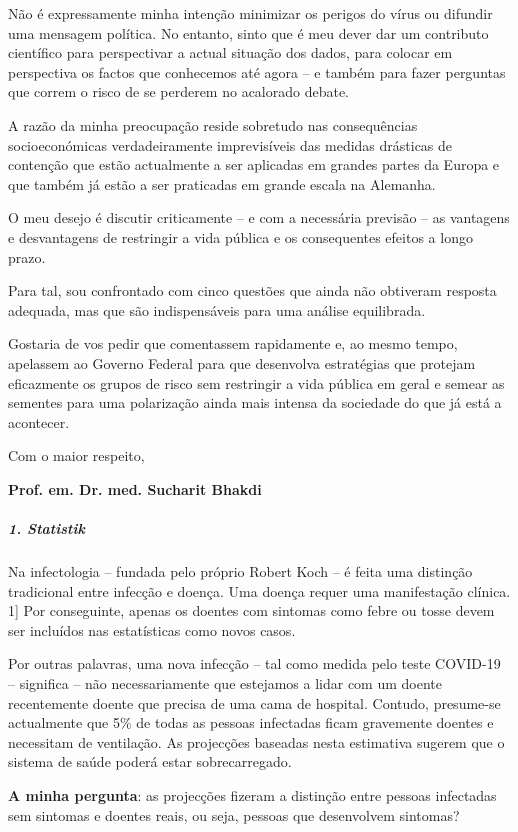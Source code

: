 Não é expressamente minha intenção minimizar os perigos do vírus ou
difundir uma mensagem política. No entanto, sinto que é meu dever dar um
contributo científico para perspectivar a actual situação dos dados,
para colocar em perspectiva os factos que conhecemos até agora -- e
também para fazer perguntas que correm o risco de se perderem no
acalorado debate.

A razão da minha preocupação reside sobretudo nas consequências
socioeconómicas verdadeiramente imprevisíveis das medidas drásticas de
contenção que estão actualmente a ser aplicadas em grandes partes da
Europa e que também já estão a ser praticadas em grande escala na
Alemanha.

O meu desejo é discutir criticamente -- e com a necessária previsão --
as vantagens e desvantagens de restringir a vida pública e os
consequentes efeitos a longo prazo.

Para tal, sou confrontado com cinco questões que ainda não obtiveram
resposta adequada, mas que são indispensáveis para uma análise
equilibrada.

Gostaria de vos pedir que comentassem rapidamente e, ao mesmo tempo,
apelassem ao Governo Federal para que desenvolva estratégias que
protejam eficazmente os grupos de risco sem restringir a vida pública em
geral e semear as sementes para uma polarização ainda mais intensa da
sociedade do que já está a acontecer.

Com o maior respeito,

\textbf{Prof. em. Dr. med. Sucharit Bhakdi}

\hypertarget{1-statistik}{%
\subparagraph{\texorpdfstring{\textbf{1.
Statistik}}{1. Statistik}}\label{1-statistik}}

Na infectologia -- fundada pelo próprio Robert Koch -- é feita uma
distinção tradicional entre infecção e doença. Uma doença requer uma
manifestação clínica. 1{]} Por conseguinte, apenas os doentes com
sintomas como febre ou tosse devem ser incluídos nas estatísticas como
novos casos.

Por outras palavras, uma nova infecção -- tal como medida pelo teste
COVID-19 -- significa -- não necessariamente que estejamos a lidar com
um doente recentemente doente que precisa de uma cama de hospital.
Contudo, presume-se actualmente que 5\% de todas as pessoas infectadas
ficam gravemente doentes e necessitam de ventilação. As projecções
baseadas nesta estimativa sugerem que o sistema de saúde poderá estar
sobrecarregado.

\textbf{A minha pergunta}: as projecções fizeram a distinção entre
pessoas infectadas sem sintomas e doentes reais, ou seja, pessoas que
desenvolvem sintomas?

